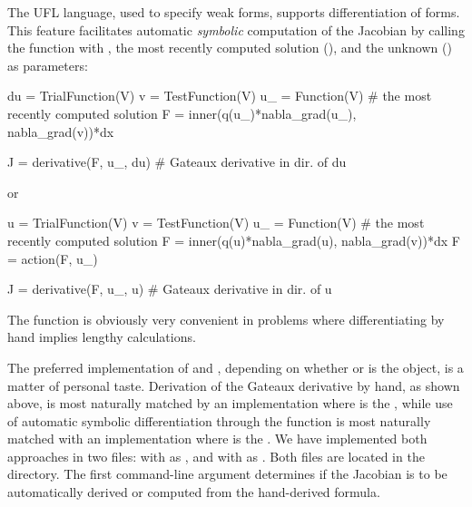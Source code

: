 The UFL language, used to specify weak forms, supports differentiation
of forms. This feature facilitates automatic \emph{symbolic} computation of the
Jacobian  by calling the function  with , the most
recently computed solution (), and the unknown
() as parameters:
\begin{python}
du = TrialFunction(V)
v  = TestFunction(V)
u_ = Function(V)      # the most recently computed solution
F  = inner(q(u_)*nabla_grad(u_), nabla_grad(v))*dx

J  = derivative(F, u_, du)  # Gateaux derivative in dir. of du
\end{python}
or
\begin{python}
u  = TrialFunction(V)
v  = TestFunction(V)
u_ = Function(V)      # the most recently computed solution
F  = inner(q(u)*nabla_grad(u), nabla_grad(v))*dx
F  = action(F, u_)

J  = derivative(F, u_, u)   # Gateaux derivative in dir. of u
\end{python}
The  function is obviously
very convenient in problems where differentiating  by hand
implies lengthy calculations.

The preferred implementation of  and , depending on whether
 or  is the  object,
is a matter of personal taste. Derivation of the Gateaux derivative
by hand, as shown above, is most naturally matched by an
implementation where  is the , while
use of automatic symbolic differentiation through the 
function is most naturally matched with an implementation where
 is the .
We have implemented both approaches in two files:
 with
 as , and
 with  as .
Both files are located in the
 directory.
The first command-line argument determines if the Jacobian is to
be automatically derived or computed from the hand-derived formula.

